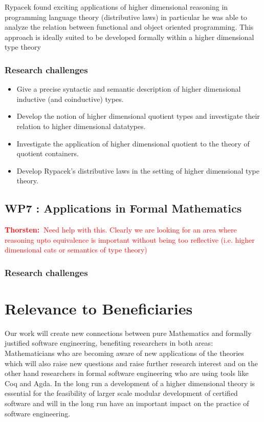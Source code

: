 \documentclass[twocolumn,a4paper,11pt]{article}
\newcommand{\txa}[1]{\textcolor{red}{\textbf{Thorsten:~}#1}}
\begin{document}
{Rypacek \cite{rypacek:thesis} found exciting applications of higher
dimensional reasoning in programming language theory (distributive
laws) in particular he was able to analyze the relation between
functional and object oriented programming. This approach is ideally
suited to be developed formally within a higher dimensional type theory


\subsubsection*{Research challenges}

\begin{itemize}
\item Give a precise syntactic and semantic description of higher
  dimensional inductive (and coinductive) types.
\item Develop the notion of higher dimensional quotient types and
  investigate their relation to higher dimensional datatypes.
\item Investigate the application of higher dimensional quotient to
  the theory of quotient containers.
\item Develop Rypacek's distributive laws in the setting of higher
  dimensional type theory.
\end{itemize}

\subsection*{WP7 : Applications in Formal Mathematics} 

\txa{Need help with this. Clearly we are looking for an area where
  reasoning upto equivalence is important without being too reflective
  (i.e. higher dimensional cats or semantics of type theory)}

\subsubsection*{Research challenges}

\section{Relevance to Beneficiaries}

Our work will create new connections between pure Mathematics and
formally justified software engineering, benefiting researchers in
both areas: Mathematicians who are becoming aware of new applications
of the theories which will also raise new questions and raise further
research interest and on the other hand researchers in formal software
engineering who are using tools like Coq and Agda. In the long run a
development of a higher dimensional theory is essential for the
feasibility of larger scale modular development of certified software
and will in the long run have an important impact on the practice of
software engineering.

}
\end{document}

